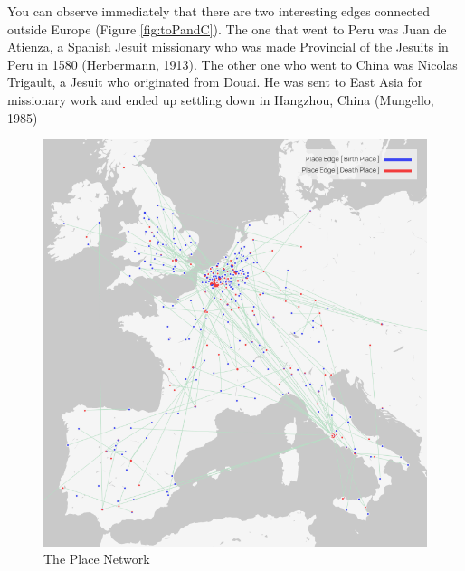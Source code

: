 \documentclass[12pt,a4paper,oneside]{book}
\begin{document}
\begin{sloppypar}
You can observe immediately that there are two interesting edges connected outside Europe (Figure \ref{fig:toPandC}). The one that went to Peru was Juan de Atienza, a Spanish Jesuit missionary who was made Provincial of the Jesuits in Peru in 1580 (Herbermann, 1913). The other one who went to China was Nicolas Trigault, a Jesuit who originated from Douai. He was sent to East Asia for missionary work and ended up settling down in Hangzhou, China (Mungello, 1985)

\begin{figure}[H]
\centering
\includegraphics[scale=0.7]{graph/Place Network.png}
\caption{The Place Network}
\label{fig:placeNet}
\end{figure}


\end{sloppypar}
\end{document}
